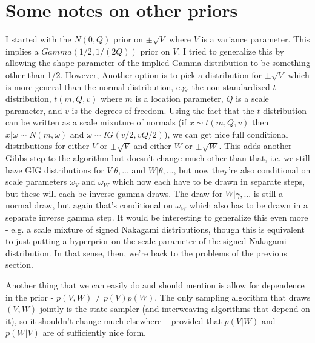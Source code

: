 \documentclass{article}
\begin{document}
\section{Some notes on other priors}
I started with the $N(0,Q)$ prior on $\pm\sqrt{V}$ where $V$ is a variance parameter. This implies a $Gamma(1/2,1/(2Q))$ prior on $V$. I tried to generalize this by allowing the shape parameter of the implied Gamma distribution to be something other than 1/2. However, Another option is to pick a distribution for $\pm\sqrt{V}$ which is more general than the normal distribution, e.g. the non-standardized $t$ distribution, $t(m, Q, v)$ where $m$ is a location parameter, $Q$ is a scale parameter, and $v$ is the degrees of freedom. Using the fact that the $t$ distribution can be written as a scale mixuture of normals (if $x\sim t(m,Q,v)$ then $x|\omega \sim N(m,\omega)$ and $\omega\sim IG(v/2, vQ/2)$), we can get nice full conditional distributions for either $V$ or $\pm\sqrt{V}$ and either $W$ or $\pm\sqrt{W}$. This adds another Gibbs step to the algorithm but doesn't change much other than that, i.e. we still have GIG distributions for $V|\theta,...$ and $W|\theta,...$, but now they're also conditional on scale parameters $\omega_V$ and $\omega_W$ which now each have to be drawn in separate steps, but these will each be inverse gamma draws. The draw for $W|\gamma,...$ is still a normal draw, but again that's conditional on $\omega_W$ which also has to be drawn in a separate inverse gamma step. It would be interesting to generalize this even more - e.g. a scale mixture of signed Nakagami distributions, though this is equivalent to just putting a hyperprior on the scale parameter of the signed Nakagami distribution. In that sense, then, we're back to the problems of the previous section.

Another thing that we can easily do and should mention is allow for dependence in the prior - $p(V,W)\neq p(V)p(W)$. The only sampling algorithm that draws $(V,W)$ jointly is the state sampler (and interweaving algorithms that depend on it), so it shouldn't change much elsewhere -- provided that $p(V|W)$ and $p(W|V)$ are of sufficiently nice form.
\end{document}
